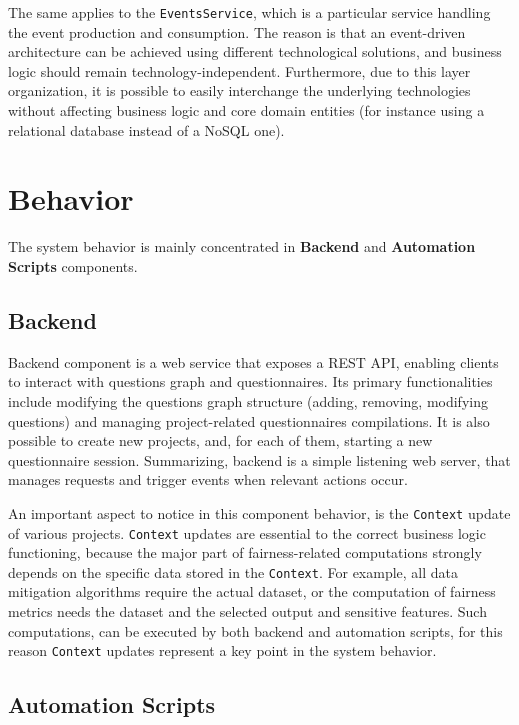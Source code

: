\documentclass[12pt,a4paper,openright,twoside]{book}
\begin{document}
The same applies to the \texttt{EventsService}, which is a particular service handling the event production and consumption.
%
The reason is that an event-driven architecture can be achieved using different technological solutions, and business logic should remain technology-independent.
%
Furthermore, due to this layer organization, it is possible to easily interchange the underlying technologies without affecting business logic and core domain entities (for instance using a relational database instead of a NoSQL one).


\section{Behavior}

The system behavior is mainly concentrated in \textbf{Backend} and \textbf{Automation Scripts} components.


\subsection{Backend}

Backend component is a web service that exposes a REST \ac{API}, enabling clients to interact with questions graph and questionnaires.
%
Its primary functionalities include modifying the questions graph structure (adding, removing, modifying questions) and managing project-related questionnaires compilations.
%
It is also possible to create new projects, and, for each of them, starting a new questionnaire session.
%
Summarizing, backend is a simple listening web server, that manages requests and trigger events when relevant actions occur.

An important aspect to notice in this component behavior, is the \texttt{Context} update of various projects.
%
\texttt{Context} updates are essential to the correct business logic functioning, because the major part of fairness-related computations strongly depends on the specific data stored in the \texttt{Context}.
%
For example, all data mitigation algorithms require the actual dataset, or the computation of fairness metrics needs the dataset and the selected output and sensitive features.
%
Such computations, can be executed by both backend and automation scripts, for this reason \texttt{Context} updates represent a key point in the system behavior.

\subsection{Automation Scripts}
\end{document}
